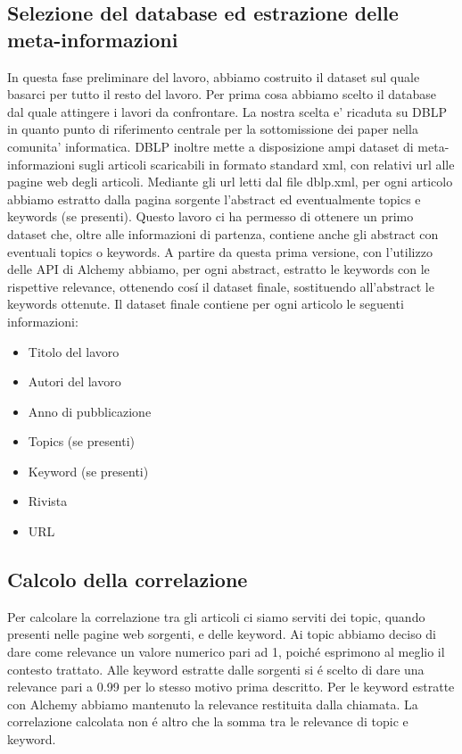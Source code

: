 \documentclass[11pt,a4paper]{article}
\begin{document}
\subsection{Selezione del database ed estrazione delle meta-informazioni}
\label{subsec:infoextraction}
In questa fase preliminare del lavoro, abbiamo costruito il dataset sul quale basarci per tutto il resto del lavoro. Per prima cosa abbiamo scelto il database dal quale attingere i lavori da confrontare. La nostra scelta e' ricaduta su DBLP\cite{DBLP} in quanto punto di riferimento centrale per la sottomissione dei paper nella comunita' informatica. DBLP inoltre mette a disposizione ampi dataset di meta-informazioni sugli articoli scaricabili in formato standard xml, con relativi url alle pagine web degli articoli.
Mediante gli url letti dal file dblp.xml, per ogni articolo abbiamo estratto dalla pagina sorgente l'abstract ed eventualmente topics e keywords (se presenti). Questo lavoro ci ha permesso di ottenere un primo dataset che, oltre alle informazioni di partenza, contiene anche gli abstract con eventuali topics o keywords. \newline
A partire da questa prima versione, con l'utilizzo delle API di Alchemy abbiamo, per ogni abstract, estratto le keywords con le rispettive relevance, ottenendo cos\'i il dataset finale, sostituendo all'abstract le keywords ottenute. Il dataset finale contiene per ogni articolo le seguenti informazioni:

\begin{itemize}
	\item Titolo del lavoro
	\item Autori del lavoro
	\item Anno di pubblicazione
	\item Topics (se presenti)
	\item Keyword (se presenti)
	\item Rivista
	\item URL
\end{itemize} 

\subsection{Calcolo della correlazione}
Per calcolare la correlazione tra gli articoli ci siamo serviti dei topic, quando presenti nelle pagine web sorgenti, e delle keyword.
Ai topic abbiamo deciso di dare come relevance un valore numerico pari ad 1, poich\'e esprimono al meglio il contesto trattato. Alle keyword estratte dalle sorgenti si \'e scelto di dare una relevance pari a 0.99 per lo stesso motivo prima descritto. Per le keyword estratte con Alchemy abbiamo mantenuto la relevance restituita dalla chiamata. La correlazione calcolata non \'e altro che la somma tra le relevance di topic e keyword.  
\end{document}
